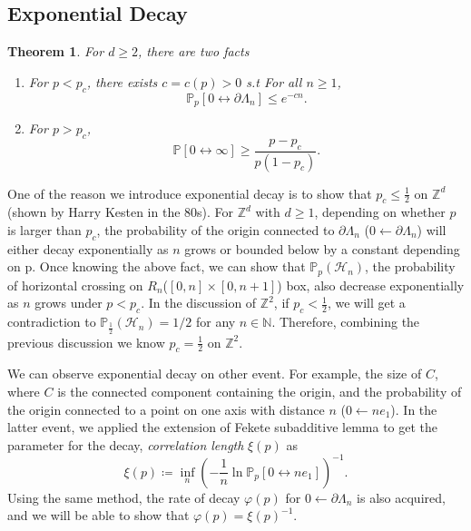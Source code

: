 \documentclass[12pt]{article}
\theoremstyle{plane}
\newtheorem*{thm}{Theorem}
\theoremstyle{definition}
\begin{document}
\subsection{Exponential Decay}\label{Course_Progress:Exponentia_Decay}
\begin{thm} For $d \geq 2$, there are two facts\\
\begin{enumerate}
	    \item For $p < p_c$, there exists $c = c(p) > 0$ s.t For all $n\geq 1$,
				$$
					\mathbb{P}_p[0 \longleftrightarrow \partial \Lambda_n] \leq e^{-cn}.	
				$$
		\item For $p > p_c$,
			$$
			\mathbb{P}[0\longleftrightarrow \infty ]\geq \frac{p-p_c}{p(1-p_c)}.
			$$
\end{enumerate}
\end{thm}
One of the reason we introduce exponential decay is to show that $p_c \leq \frac{1}{2}$ on $\mathbb{Z}^d$(shown by Harry Kesten in the 80s). 
For $\mathbb{Z}^d$ with $d\geq 1$, depending on whether $p$ is larger than $p_c$, the probability of the origin connected to $\partial \Lambda_n$  ($0 \longleftarrow \partial \Lambda_n$) will either decay exponentially as $n$ grows or bounded below by a constant depending on p. 
Once knowing the above fact, we can show that $\mathbb{P}_p (\mathcal{H}_n)$, the probability of horizontal crossing on $R_n$($[0,n]\times [0,n+1]$) box, also decrease exponentially as $n$ grows under $p < p_c$. 
In the discussion of $\mathbb{Z}^2$, if $p_c < \frac{1}{2}$, we will get a contradiction to $\mathbb{P}_{\frac{1}{2}}(\mathcal{H}_n) = 1/2$ for any $n \in \mathbb{N}$. Therefore, combining the previous discussion we know $p_c = \frac{1}{2}$ on $\mathbb{Z}^2$.

We can observe exponential decay on other event. For example, the size of $C$, where $C$ is the connected component containing the origin, and the probability of the origin connected to a point on one axis with distance $n$ ($0 \longleftarrow ne_1$). In the latter event, we applied the extension of Fekete subadditive lemma to get the parameter for the decay, \textit{correlation length} $\xi(p)$ as 
$$
\xi(p) \coloneqq \inf_{n} \left(-\frac{1}{n}\ln{\mathbb{P}_p[0 \leftrightarrow ne_1]}\right)^{-1}.
$$
Using the same method, the rate of decay $\varphi(p)$ for $0 \longleftarrow \partial \Lambda_n$ is also acquired, and we will be able to show that $\varphi(p) = \xi(p)^{-1}$.

\end{document}
